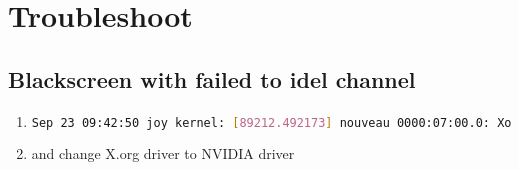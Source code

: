 \chapter{Troubleshoot}

\section{Blackscreen with failed to idel channel}
\begin{enumerate}
\item{}
\begin{lstlisting}[language=bash, caption={cat /var/log/syslog}]
Sep 23 09:42:50 joy kernel: [89212.492173] nouveau 0000:07:00.0: Xorg[1250]: failed to idle channel 8 [Xorg[1250]]
\end{lstlisting}
\item{} and change X.org driver to NVIDIA driver
\end{enumerate}
